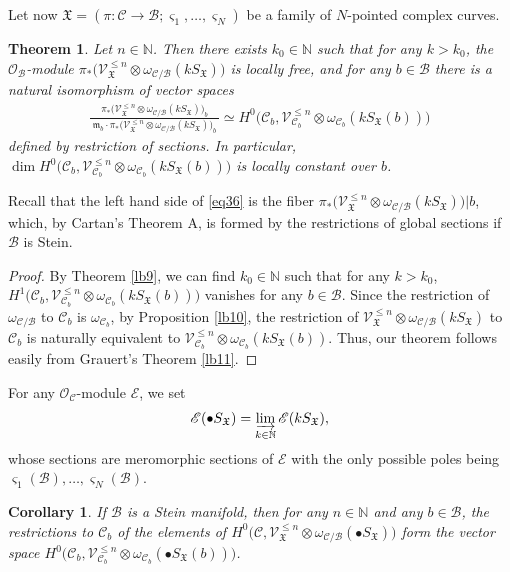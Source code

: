 \documentclass[11pt,b5paper,notitlepage]{article}
\theoremstyle{definition}
\theoremstyle{plain}
\newtheorem{thm}[df]{Theorem}
\newtheorem{co}[df]{Corollary}
\newcommand{\fk}{\mathfrak}
\newcommand{\mc}{\mathcal}
\newcommand{\scr}{\mathscr}
\newcommand{\sgm}{\varsigma}
\newcommand{\SX}{S_{\fk X}}
\newcommand{\mbb}{\mathbb}
\newcommand{\blt}{\bullet}
\newcommand{\Nbb}{\mathbb N}
\numberwithin{equation}{section}
\begin{document}
Let now $\fk X=(\pi:\mc C\rightarrow\mc B;\sgm_1,\dots,\sgm_N)$ be a family of $N$-pointed complex curves.

\begin{thm}\label{lb8}
Let $n\in\Nbb$. Then  there exists $k_0\in\mbb N$ such that for any $k>k_0$, the $\scr O_{\mc B}$-module  $\pi_*\big(\scr V_{\fk X}^{\leq n}\otimes\omega_{\mc C/\mc B}(k\SX)\big)$ is locally free, and for any $b\in\mc B$ there is a natural isomorphism of vector spaces
\begin{align}
	\frac{\pi_*\big(\scr V_{\fk X}^{\leq n}\otimes\omega_{\mc C/\mc B}(k\SX)\big)_b}{~\fk m_b\cdot\pi_*\big(\scr V_{\fk X}^{\leq n}\otimes\omega_{\mc C/\mc B}(k\SX)\big)_b~}\simeq H^0\big(\mc C_b,\scr V_{\mc C_b}^{\leq n}\otimes\omega_{\mc C_b}(k\SX(b))\big)\label{eq36}
\end{align} 
defined by  restriction of sections. In particular,  $\dim  H^0\big(\mc C_b,\scr V_{\mc C_b}^{\leq n}\otimes\omega_{\mc C_b}(k\SX(b))\big)$ is locally constant over $b$.
\end{thm}

Recall that the left hand side of \eqref{eq36} is the fiber $\pi_*\big(\scr V_{\fk X}^{\leq n}\otimes\omega_{\mc C/\mc B}(k\SX)\big)\big|b$, which, by Cartan's Theorem A, is formed by the restrictions of global sections if $\mc B$ is Stein.

\begin{proof}
By Theorem \ref{lb9}, we can find $k_0\in\Nbb$ such that for any $k>k_0$, $H^1\big(\mc C_b,\scr V_{\mc C_b}^{\leq n}\otimes\omega_{\mc C_b}(k\SX(b))\big)$ vanishes for any $b\in\mc B$. Since the restriction of $\omega_{\mc C/\mc B}$ to $\mc C_b$ is $\omega_{\mc C_b}$, by Proposition \ref{lb10}, the restriction of $\scr V_{\fk X}^{\leq n}\otimes\omega_{\mc C/\mc B}(k\SX)$ to $\mc C_b$ is naturally equivalent to $\scr V_{\mc C_b}^{\leq n}\otimes\omega_{\mc C_b}(k\SX(b))$.  Thus, our theorem follows easily from Grauert's Theorem \ref{lb11}.
\end{proof}


For any $\scr O_{\mc C}$-module $\scr E$, we \index{SX@$\blt\SX$} set
\begin{align*}
\scr E(\blt\SX)=\varinjlim_{k\in\Nbb}\scr E(k\SX),
\end{align*}
whose sections are meromorphic sections of $\scr E$ with the only possible poles being $\sgm_1(\mc B),\dots,\sgm_N(\mc B)$.


\begin{co}\label{lb16}
If $\mc B$ is a Stein manifold, then for any $n\in\Nbb$ and any $b\in \mc B$, the restrictions to $\mc C_b$ of the elements of $H^0\big(\mc C,\scr V_{\fk X}^{\leq n}\otimes\omega_{\mc C/\mc B}(\blt\SX)\big)$  form the vector space $H^0\big(\mc C_b,\scr V_{\mc C_b}^{\leq n}\otimes\omega_{\mc C_b}(\blt\SX(b))\big)$.
\end{co}
\end{document}
